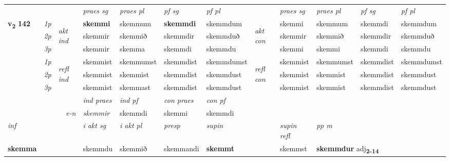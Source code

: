 \begin{longtable}[l]{X>{\footnotesize\itshape}llXXXXlXXXX}
 & &   & \textit{praes sg}  & \textit{praes pl}    & \textit{ pf sg} & \textit{pf pl} & & \textit{praes sg}  & \textit{praes pl}    & \textit{pf sg} & \textit{pf pl }  \\ \cmidrule{4-7} \cmidrule{9-12}
 \multirow{2}{*}{{{\textbf{v{\textsubscript{2}}} \Large{\textbf{142}}}}}  & 1p & \multirow{3}{*}{\begin{turn}{90}\textit{akt ind}\end{turn}} & \textbf{skemmi} & skemmum & \textbf{skemmdi} & skemmdum & \multirow{3}{*}{\begin{turn}{90}\textit{akt con}\end{turn}} &skemmi & skemmum & skemmdi & skemmdum\\*
 & 2p &  &  skemmir  & skemmið & skemmdir & skemmduð & & skemmir & skemmið & skemmdir & skemmduð \\*
 & 3p &  & skemmir & skemma & skemmdi & skemmdu & & skemmi & skemmi& skemmdi & skemmdu \\*
\cmidrule{4-7} \cmidrule{9-12}
 & 1p & \multirow{3}{*}{\begin{turn}{90}\textit{refl ind}\end{turn}}  & skemmist & skemmumst & skemmdist & skemmdumst & \multirow{3}{*}{\begin{turn}{90}\textit{refl con}\end{turn}}  &skemmist & skemmumst & skemmdist & skemmdumst \\*
 & 2p &  & skemmist & skemmist & skemmdist & skemmdust & &skemmist & skemmist & skemmdist & skemmdust \\*
 & 3p  & & skemmist & skemmast & skemmdist & skemmdust & & skemmist & skemmist& skemmdist & skemmdust \\*
\cmidrule{4-7} \cmidrule{9-12}

   && &  \textit{ind praes} & \textit{ind pf} & \textit{con praes} & \textit{con pf} \\*
\multicolumn{3}{r}{\textit{e-n}} & skemmir & skemmdi & skemmi & skemmdi \\*

\cmidrule{4-7}
   {\textit{inf}} & &  & \textit{i akt sg} & \textit{i akt pl}   & \textit{presp} & \textit{supin} && \textit{supin refl} & \textit{pp m} \\*
  {\textbf{skemma}} & && skemmdu  & skemmið   & skemmandi &  \textbf{skemmt} && skemmst & \multicolumn{2}{l}{\textbf{skemmdur} adj\textbf{\textsubscript{2-14}}} \\*

\midrule


\end{longtable}
